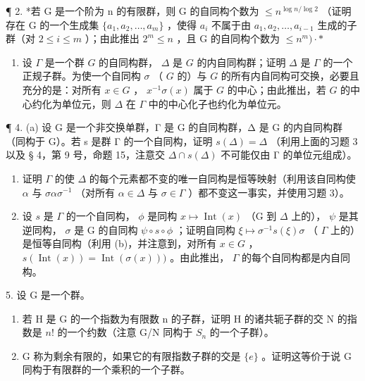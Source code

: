 ¶ 2. *若 G 是一个阶为 n 的有限群，则 G 的自同构个数为 \(\leqslant n^{\log n/\log 2}\) （证明存在 G 的一个生成集 \(\{a_{1}, a_{2}, \ldots, a_{m}\}\) ，使得 \(a_{i}\) 不属于由 \(a_{1}, a_{2}, \ldots, a_{i-1}\) 生成的子群（对 \(2 \leqslant i \leqslant m\) ）；由此推出 \(2^{m} \leqslant n\) ，且 G 的自同构个数为 \(\leqslant n^{m})\cdot*\)

\begin{enumerate}
\def\labelenumi{\arabic{enumi}.}
\setcounter{enumi}{2}
\tightlist
\item
  设 \(\Gamma\) 是一个群 \(G\) 的自同构群， \(\Delta\) 是 \(G\) 的内自同构群；证明 \(\Delta\) 是 \(\Gamma\) 的一个正规子群。为使一个自同构 \(\sigma\) （ \(G\) 的）与 \(G\) 的所有内自同构可交换，必要且充分的是：对所有 \(x \in G\) ， \(x^{-1}\sigma(x)\) 属于 \(G\) 的中心；由此推出，若 \(G\) 的中心约化为单位元，则 \(\Delta\) 在 \(\Gamma\) 中的中心化子也约化为单位元。
\end{enumerate}

¶ 4. (a) 设 G 是一个非交换单群，Γ 是 G 的自同构群，Δ 是 G 的内自同构群（同构于 G）。若 s 是群 Γ 的一个自同构，证明 \(s(\Delta) = \Delta\) （利用上面的习题 3 以及 § 4，第 9 号，命题 15，注意交 \(\Delta \cap s(\Delta)\) 不可能仅由 Γ 的单位元组成）。

\begin{enumerate}
\def\labelenumi{(\alph{enumi})}
\setcounter{enumi}{1}
\item
  证明 \(\Gamma\) 的使 \(\Delta\) 的每个元素都不变的唯一自同构是恒等映射（利用该自同构使 \(\alpha\) 与 \(\sigma \alpha \sigma^{-1}\) （对所有 \(\alpha \in \Delta\) 与 \(\sigma \in \Gamma\) ）都不变这一事实，并使用习题 3）。
\item
  设 \(s\) 是 \(\Gamma\) 的一个自同构， \(\phi\) 是同构 \(x \mapsto \operatorname{Int}(x)\) （G 到 \(\Delta\) 上的）， \(\psi\) 是其逆同构， \(\sigma\) 是 G 的自同构 \(\psi \circ s \circ \phi\) ；证明自同构 \(\xi \mapsto \sigma^{-1}s(\xi)\sigma\) （ \(\Gamma\) 上的）是恒等自同构（利用 (b)，并注意到，对所有 \(x \in G\) ， \(s(\operatorname{Int}(x)) = \operatorname{Int}(\sigma(x)))\) 。由此推出， \(\Gamma\) 的每个自同构都是内自同构。
\end{enumerate}

5. 设 G 是一个群。

\begin{enumerate}
\def\labelenumi{(\alph{enumi})}
\item
  若 H 是 G 的一个指数为有限数 n 的子群，证明 H 的诸共轭子群的交 N 的指数是 \(n!\) 的一个约数（注意 G/N 同构于 \(S_{n}\) 的一个子群）。
\item
  G 称为剩余有限的，如果它的有限指数子群的交是 \(\{e\}\) 。证明这等价于说 G 同构于有限群的一个乘积的一个子群。
\end{enumerate}
